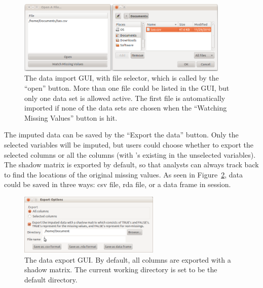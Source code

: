 \documentclass[article]{jss}
\begin{document}
\begin{center}
\begin{figure}[h]
\begin{centering}
\includegraphics[width=0.9\textwidth]{graph/fig6-open}
\par\end{centering}
\caption{The data import GUI, with file selector, which is called by the ``open'' button. More than one file could be listed in the GUI, but only one data set is allowed active. The first file is automatically imported if none of the data sets are chosen when the ``Watching Missing Values'' button is hit. }
\label{fig: import}
\end{figure}
\par\end{center}

The imputed data can be saved by the ``Export the data'' button. Only the selected variables will be imputed, but users could choose whether to export the selected columns or all the columns (with 's existing in the unselected variables). The shadow matrix is exported by default, so that analysts can always track back to find the locations of the original missing values. As seen in Figure~\ref{fig: export}, data could be saved in three ways: csv file, rda file, or a data frame in  session.

\begin{center}
\begin{figure}[h]
\begin{centering}
\includegraphics[width=0.6\textwidth]{graph/fig7-export}
\par\end{centering}
\caption{The data export GUI. By default, all columns are exported with a shadow matrix. The current working directory is set to be the default directory.}
\label{fig: export}
\end{figure}
\par\end{center}
\end{document}
